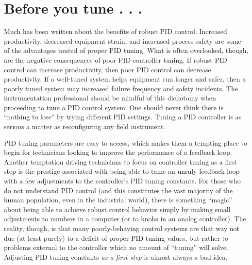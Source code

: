 










\filbreak
\section{Before you tune . . .}

\label{before_you_tune}

Much has been written about the benefits of robust PID control.  Increased productivity, decreased equipment strain, and increased process safety are some of the advantages touted of proper PID tuning.  What is often overlooked, though, are the negative consequences of poor PID controller tuning.  If robust PID control can increase productivity, then poor PID control can decrease productivity.  If a well-tuned system helps equipment run longer and safer, then a poorly tuned system may increased failure frequency and safety incidents.  The instrumentation professional should be mindful of this dichotomy when proceeding to tune a PID control system.  One should never think there is ``nothing to lose'' by trying different PID settings.  Tuning a PID controller is as serious a matter as reconfiguring any field instrument.

PID tuning parameters are easy to access, which makes them a tempting place to begin for technicians looking to improve the performance of a feedback loop.  Another temptation driving technicians to focus on controller tuning as a first step is the prestige associated with being able to tame an unruly feedback loop with a few adjustments to the controller's PID tuning constants.  For those who do not understand PID control (and this constitutes the vast majority of the human population, even in the industrial world), there is something ``magic'' about being able to achieve robust control behavior simply by making small adjustments to numbers in a computer (or to knobs in an analog controller).  The reality, though, is that many poorly-behaving control systems are that way not due (at least purely) to a deficit of proper PID tuning values, but rather to problems external to the controller which no amount of ``tuning'' will solve.  Adjusting PID tuning constants \textit{as a first step} is almost always a bad idea.

